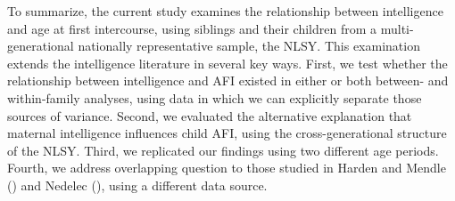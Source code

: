 To summarize, the current study examines the relationship between intelligence and age at first intercourse, using siblings and their children from a multi-generational nationally representative sample, the NLSY. This examination extends the intelligence literature in several key ways. First, we test whether the relationship between intelligence and AFI existed in either or both between- and within-family analyses, using data in which we can explicitly separate those sources of variance. Second, we evaluated the alternative explanation that maternal intelligence influences child AFI, using the cross-generational structure of the NLSY. Third, we replicated our findings using two different age periods. Fourth, we address overlapping question to those studied in Harden and Mendle (\citeyear{harden2011don}) and Nedelec \et (\citeyear{nedelec2012exploring}), using a different data source.

